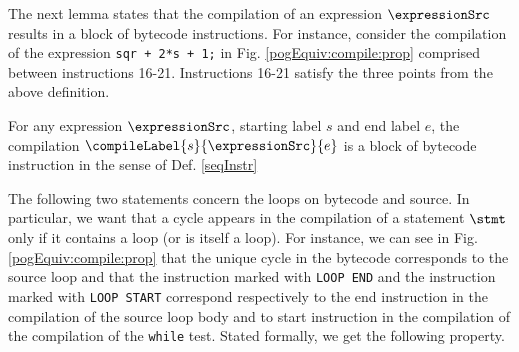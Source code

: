 The next lemma states that the compilation of an expression $\expressionSrc$ results in
 a block of bytecode instructions.  For instance, consider the compilation of the expression \lstinline!sqr + 2*s + 1;! in Fig. \ref{pogEquiv:compile:prop}  
 comprised between instructions 16-21. Instructions  16-21 satisfy the three points from the above definition.
\begin{compProp3}\label{compile:prop:compProp3}
    For any expression $\expressionSrc$, starting label $s$ and end label $e$,
    the compilation $\compileLabel{s}{\expressionSrc}{e}$ is a block of bytecode instruction in the sense of Def. \ref{seqInstr}
   
\end{compProp3}


The following two statements concern the loops on bytecode and source. 
In particular, we want that a cycle appears in the compilation of a statement  $\stmt$  only if it contains a loop (or is itself a loop).
For instance, we can  see in Fig. \ref{pogEquiv:compile:prop} that the unique cycle in the bytecode corresponds to the source loop and that the 
instruction marked with \lstinline!LOOP END! and the instruction marked with \lstinline!LOOP START! correspond respectively to the end instruction   in the 
compilation of the source loop body   and to start instruction in the compilation of the compilation of the \lstinline!while! test. 
Stated formally, we get the following property. 

